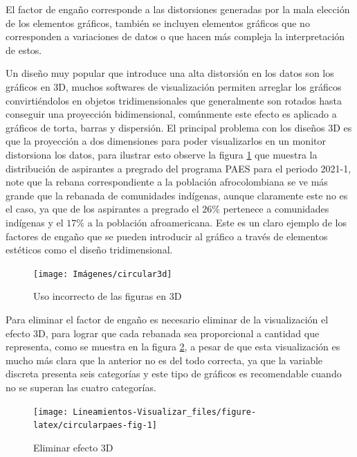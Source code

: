 \documentclass[
]{book}
\begin{document}
El factor de engaño corresponde a las distorsiones generadas por la mala elección de los elementos gráficos, también se incluyen elementos gráficos que no corresponden a variaciones de datos o que hacen más compleja la interpretación de estos.

Un diseño muy popular que introduce una alta distorsión en los datos son los gráficos en 3D, muchos softwares de visualización permiten arreglar los gráficos convirtiéndolos en objetos tridimensionales que generalmente son rotados hasta conseguir una proyección bidimensional, comúnmente este efecto es aplicado a gráficos de torta, barras y dispersión. El principal problema con los diseños 3D es que la proyección a dos dimensiones para poder visualizarlos en un monitor distorsiona los datos, para ilustrar esto observe la figura \ref{fig:circular3d-fig} que muestra la distribución de aspirantes a pregrado del programa PAES para el periodo 2021-1, note que la rebana correspondiente a la población afrocolombiana se ve más grande que la rebanada de comunidades indígenas, aunque claramente este no es el caso, ya que de los aspirantes a pregrado el \(26\%\) pertenece a comunidades indígenas y el \(17\%\) a la población afroamericana. Este es un claro ejemplo de los factores de engaño que se pueden introducir al gráfico a través de elementos estéticos como el diseño tridimensional.

\begin{figure}

{\centering \texttt{[image: Imágenes/circular3d]} 

}

\caption{Uso incorrecto de las figuras en 3D}\label{fig:circular3d-fig}
\end{figure}

Para eliminar el factor de engaño es necesario eliminar de la visualización el efecto 3D, para lograr que cada rebanada sea proporcional a cantidad que representa, como se muestra en la figura \ref{fig:circularpaes-fig}, a pesar de que esta visualización es mucho más clara que la anterior no es del todo correcta, ya que la variable discreta presenta seis categorías y este tipo de gráficos es recomendable cuando no se superan las cuatro categorías.

\begin{figure}

{\centering \texttt{[image: Lineamientos-Visualizar\_files/figure-latex/circularpaes-fig-1]} 

}

\caption{Eliminar efecto 3D}\label{fig:circularpaes-fig}
\end{figure}
\end{document}
